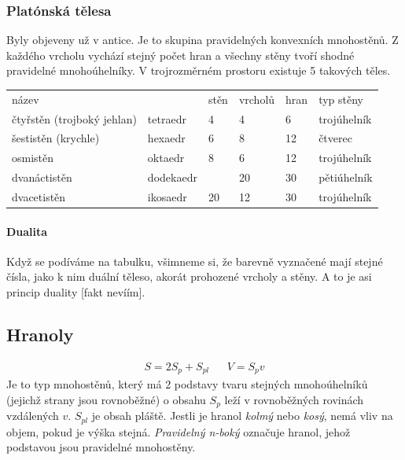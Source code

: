\documentclass[12pt]{article}
\begin{document}
\subsubsection{Platónská tělesa}
Byly objeveny už v antice. Je to skupina pravidelných konvexních mnohostěnů. Z každého vrcholu vychází stejný počet hran a všechny stěny tvoří shodné pravidelné mnohoúhelníky. V trojrozměrném prostoru existuje 5 takových těles.
\begin{table}[]
\begin{tabular}{llllll}
název               &           & stěn                                              & vrcholů                    & hran                      & typ stěny   \\
čtyřstěn (trojboký jehlan)         & tetraedr  & \cellcolor[HTML]{9698ED}4                         & \cellcolor[HTML]{9698ED}4  & 6                         & trojúhelník \\
šestistěn (krychle) & hexaedr   & \cellcolor[HTML]{FFFE65}6                         & \cellcolor[HTML]{FD6864}8  & 12                        & čtverec     \\
osmistěn            & oktaedr   & \cellcolor[HTML]{FD6864}8                         & \cellcolor[HTML]{FFFE65}6  & {\color[HTML]{000000} 12} & trojúhelník \\
dvanáctistěn        & dodekaedr & \cellcolor[HTML]{96FFFB}{\color[HTML]{000000} 12} & \cellcolor[HTML]{67FD9A}20 & 30                        & pětiúhelník \\
dvacetistěn         & ikosaedr  & \cellcolor[HTML]{67FD9A}20                        & \cellcolor[HTML]{96FFFB}12 & 30                        & trojúhelník
\end{tabular}
\end{table}
\paragraph{Dualita}
Když se podíváme na tabulku, všimneme si, že barevně vyznačené mají stejné čísla, jako k nim duální těleso, akorát prohozené vrcholy a stěny. A to je asi princip duality [fakt nevíím].
\subsection{Hranoly}
\begin{align}
S = 2S_p + S_{pl} &&V = S_p v
\end{align}
Je to typ mnohostěnů, který má 2 podstavy tvaru stejných mnohoúhelníků (jejichž strany jsou rovnoběžné) o obsahu $S_p$ leží v rovnoběžných rovinách vzdálených $v$. $S_{pl}$ je obsah pláště. Jestli je hranol \emph{kolmý} nebo \emph{kosý}, nemá vliv na objem, pokud je výška stejná. \emph{Pravidelný n-boký} označuje hranol, jehož podstavou jsou pravidelné mnohostěny.
\end{document}
